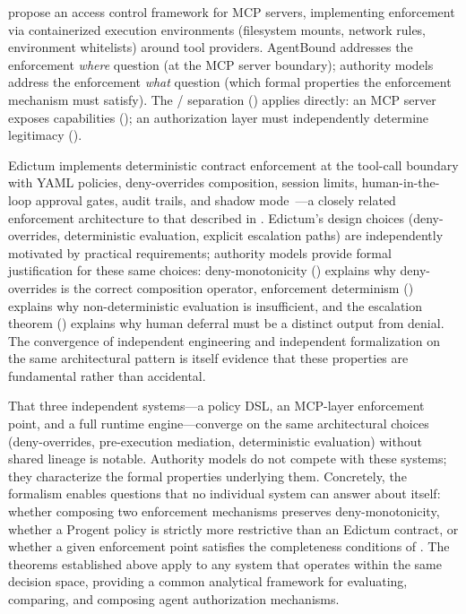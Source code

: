 \documentclass[11pt,a4paper]{article}
\newcommand{\termlabel}[1]{\ifmmode\mathsf{#1}\else{\normalfont\textsc{\MakeLowercase{#1}}}\fi}
\newcommand{\May}{\termlabel{May}}
\newcommand{\Can}{\termlabel{Can}}
\begin{document}
\citet{buhler2025agentbound} propose an access control framework for MCP servers, implementing enforcement via containerized execution environments (filesystem mounts, network rules, environment whitelists) around tool providers. AgentBound addresses the enforcement \emph{where} question (at the MCP server boundary); authority models address the enforcement \emph{what} question (which formal properties the enforcement mechanism must satisfy). The \Can/\May{} separation () applies directly: an MCP server exposes capabilities (\Can); an authorization layer must independently determine legitimacy (\May).

Edictum implements deterministic contract enforcement at the tool-call boundary with YAML policies, deny-overrides composition, session limits, human-in-the-loop approval gates, audit trails, and shadow mode~\citep{cartagena2026edictum}---a closely related enforcement architecture to that described in . Edictum's design choices (deny-overrides, deterministic evaluation, explicit escalation paths) are independently motivated by practical requirements; authority models provide formal justification for these same choices: deny-monotonicity () explains why deny-overrides is the correct composition operator, enforcement determinism () explains why non-deterministic evaluation is insufficient, and the escalation theorem () explains why human deferral must be a distinct output from denial. The convergence of independent engineering and independent formalization on the same architectural pattern is itself evidence that these properties are fundamental rather than accidental.

\noindent That three independent systems---a policy DSL, an MCP-layer enforcement point, and a full runtime engine---converge on the same architectural choices (deny-overrides, pre-execution mediation, deterministic evaluation) without shared lineage is notable. Authority models do not compete with these systems; they characterize the formal properties underlying them. Concretely, the formalism enables questions that no individual system can answer about itself: whether composing two enforcement mechanisms preserves deny-monotonicity, whether a Progent policy is strictly more restrictive than an Edictum contract, or whether a given enforcement point satisfies the completeness conditions of . The theorems established above apply to any system that operates within the same decision space, providing a common analytical framework for evaluating, comparing, and composing agent authorization mechanisms.
\end{document}
